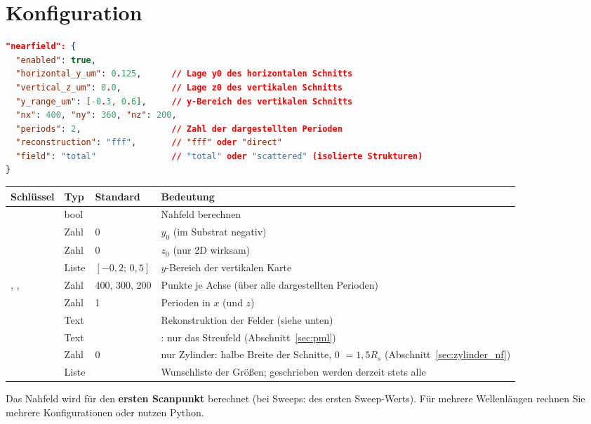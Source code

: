 \section{Konfiguration}
\begin{lstlisting}[language=json]
"nearfield": {
  "enabled": true,
  "horizontal_y_um": 0.125,      // Lage y0 des horizontalen Schnitts
  "vertical_z_um": 0.0,          // Lage z0 des vertikalen Schnitts
  "y_range_um": [-0.3, 0.6],     // y-Bereich des vertikalen Schnitts
  "nx": 400, "ny": 360, "nz": 200,
  "periods": 2,                  // Zahl der dargestellten Perioden
  "reconstruction": "fff",       // "fff" oder "direct"
  "field": "total"               // "total" oder "scattered" (isolierte Strukturen)
}
\end{lstlisting}
\begin{center}
\small
\begin{tabularx}{\linewidth}{lllY}
\toprule
Schlüssel & Typ & Standard & Bedeutung \\
\midrule
{} & bool &  & Nahfeld berechnen \\
 & Zahl & 0 & $y_0$ (im Substrat negativ) \\
 & Zahl & 0 & $z_0$ (nur 2D wirksam) \\
 & Liste & $[-0{,}2;\,0{,}5]$ & $y$-Bereich der vertikalen Karte \\
, ,  & Zahl & 400, 300, 200 & Punkte je Achse (über alle dargestellten Perioden) \\
 & Zahl & 1 & Perioden in $x$ (und $z$) \\
 & Text &  & Rekonstruktion der Felder (siehe unten) \\
 & Text &  & : nur das Streufeld (Abschnitt~\ref{sec:pml}) \\
 & Zahl & 0 & nur Zylinder: halbe Breite der Schnitte, 0 $=1{,}5R_s$ (Abschnitt~\ref{sec:zylinder_nf}) \\
 & Liste & & Wunschliste der Größen; geschrieben werden derzeit stets alle \\
\bottomrule
\end{tabularx}
\end{center}
Das Nahfeld wird für den \textbf{ersten Scanpunkt} berechnet (bei Sweeps: des ersten Sweep-Werts). Für mehrere
Wellenlängen rechnen Sie mehrere Konfigurationen oder nutzen Python.

